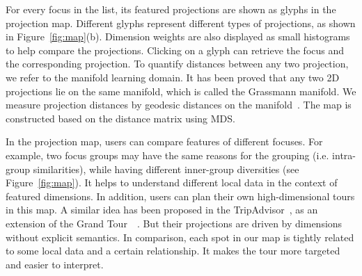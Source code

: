 For every focus in the list, its featured projections are shown as glyphs in the projection map. Different glyphs represent different types of projections, as shown in Figure~\ref{fig:map}(b). Dimension weights are also displayed as small histograms to help compare the projections. Clicking on a glyph can retrieve the focus and the corresponding projection. To quantify distances between any two projection, we refer to the manifold learning domain. It has been proved that any two 2D projections lie on the same manifold, which is called the Grassmann manifold. We measure projection distances by geodesic distances on the manifold~\cite{absil2004riemannian}. The map is constructed based on the distance matrix using MDS.

In the projection map, users can compare features of different focuses. For example, two focus groups may have the same reasons for the grouping (i.e. intra-group similarities), while having different inner-group diversities (see Figure~\ref{fig:map}). It helps to understand different local data in the context of featured dimensions. In addition, users can plan their own high-dimensional tours in this map. A similar idea has been proposed in the TripAdvisor~\cite{DBLP:journals/tvcg/NamM13}, as an extension of the Grand Tour~\cite{asimov1985grand}~\cite{cook1995grand}. But their projections are driven by dimensions without explicit semantics. In comparison, each spot in our map is tightly related to some local data and a certain relationship. It makes the tour more targeted and easier to interpret.